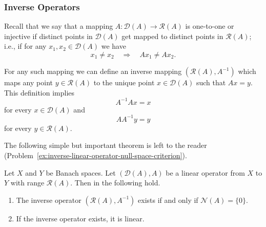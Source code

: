 \subsubsection{Inverse Operators}\label{subsec:inverse-operators}

Recall that we say that a mapping $A:\mathcal{D}(A)\to\mathcal{R}(A)$ is one-to-one or injective if distinct points in $\mathcal{D}(A)$ get mapped to distinct points in $\mathcal{R}(A)$; i.e., if for any $x_1,x_2\in\mathcal{D}(A)$ we have
\begin{equation}\label{eq:linear-operator-injectivity-condition}
x_1\ne x_2\quad\Rightarrow\quad Ax_1\ne Ax_2.
\end{equation}


For any such mapping we can define an inverse mapping $(\mathcal{R}(A),A^{-1})$ which maps any point $y\in\mathcal{R}(A)$ to the unique point $x\in\mathcal{D}(A)$ such that $Ax=y$. This definition implies
\begin{equation}\label{eq:inverse-operator-left-identity}
A^{-1}Ax=x
\end{equation}
for every $x\in\mathcal{D}(A)$ and
\begin{equation}\label{eq:inverse-operator-right-identity}
AA^{-1}y=y
\end{equation}
for every $y\in\mathcal{R}(A)$.

The following simple but important theorem is left to the reader (Problem~\ref{ex:inverse-linear-operator-null-space-criterion}).

\begin{Theorem}
\label{thm:inverse-linear-operator-null-space}
Let $X$ and $Y$ be Banach spaces. Let $(\mathcal{D}(A),A)$ be a linear operator from $X$ to $Y$ with range $\mathcal{R}(A)$. Then in the following hold.\begin{enumerate}
\item The inverse operator $(\mathcal{R}(A),A^{-1})$ exists if and only if $\mathcal{N}(A)=\{0\}$.
\item If the inverse operator exists, it is linear.
\end{enumerate}
\end{Theorem}
